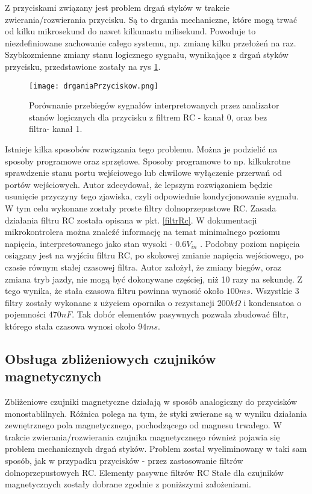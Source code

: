 Z przyciskami związany jest problem drgań styków w trakcie zwierania/rozwierania przycisku. Są to drgania mechaniczne, które mogą trwać od kilku mikrosekund do nawet kilkunastu milisekund. Powoduje to niezdefiniowane zachowanie całego systemu, np. zmianę kilku przełożeń na raz. Szybkozmienne zmiany stanu logicznego sygnału, wynikające z drgań styków przycisku, przedstawione zostały na rys \ref{fig:drganiaPrzyciskow}.
\begin{figure}[h]
    \centering
    \texttt{[image: drganiaPrzyciskow.png]}
    \caption{Porównanie przebiegów sygnałów interpretowanych przez analizator stanów logicznych dla przycisku z filtrem RC - kanał 0, oraz bez filtra- kanał 1.}
    \label{fig:drganiaPrzyciskow}
\end{figure}
Istnieje kilka sposobów rozwiązania tego problemu. Można je podzielić na sposoby programowe oraz sprzętowe. Sposoby programowe to np. kilkukrotne sprawdzenie stanu portu wejściowego lub chwilowe wyłączenie przerwań od portów wejściowych. Autor zdecydował, że lepszym rozwiązaniem będzie usunięcie przyczyny tego zjawiska, czyli odpowiednie kondycjonowanie sygnału. W tym celu wykonane zostały proste filtry dolnoprzepustowe RC. Zasada działania filtru RC została opisana w pkt. \ref{filtrRc}. W dokumentacji mikrokontrolera można znaleźć informację na temat minimalnego poziomu napięcia, interpretowanego jako stan wysoki - $0.6V_{in}$ \cite{tiva}. Podobny poziom napięcia osiągany jest na wyjściu filtru RC, po skokowej zmianie napięcia wejściowego, po czasie równym stałej czasowej filtra. Autor założył, że zmiany biegów, oraz zmiana tryb jazdy, nie mogą być dokonywane częściej, niż 10 razy na sekundę. Z tego wynika, że stała czasowa filtru powinna wynosić około $100ms$. Wszystkie 3 filtry zostały wykonane z użyciem opornika o rezystancji $200k\Omega$ i kondensatoa o pojemności 470$nF$. Tak dobór elementów pasywnych pozwala zbudować filtr, którego stała czasowa wynosi około $94ms$.
\subsection{Obsługa zbliżeniowych czujników magnetycznych}
Zbliżeniowe czujniki magnetyczne działają w sposób analogiczny do przycisków monostablilnych. Różnica polega na tym, że styki zwierane są w wyniku działania zewnętrznego pola magnetycznego, pochodzącego od magnesu trwałego. W trakcie zwierania/rozwierania czujnika magnetycznego również pojawia się problem mechanicznych drgań styków. Problem został wyeliminowany w taki sam sposób, jak w przypadku przycisków - przez zastosowanie filtrów dolnoprzepustowych RC. Elementy pasywne filtrów RC Stałe dla czujników magnetycznych zostały dobrane zgodnie z poniższymi założeniami.

